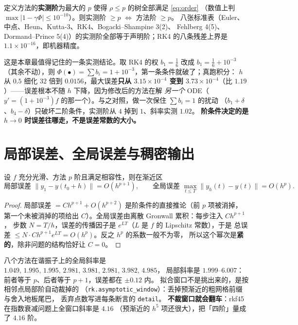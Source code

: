 \begin{corollary}[名义阶与实测阶]
\label{cor:measured}
定义方法的\textbf{实测阶}为最大的 $p$ 使得 $\rho\le p$ 的树全部满足 \eqref{eq:order}
（数值上判 $\max|1-\gamma\Phi|\le10^{-10}$）。则实测阶 $\ge p$ $\iff$ 方法阶 $\ge p$。
八张标准表（Euler、中点、Heun、Kutta-3、RK4、Bogacki--Shampine 3(2)、
Fehlberg 4(5)、Dormand--Prince 5(4)）的实测阶全部等于声明阶；RK4 的八条残差上界是
$1.1\times10^{-16}$，即机器精度。
\end{corollary}

\begin{remark}
这是本章最值得记住的一条实测结论。取 RK4 的权 $b_1=\frac16$ 改成 $b_1=\frac16+10^{-3}$
（其余不动），则 $\Phi(\bullet)=\sum b_i=1+10^{-3}$，第一条条件就破了；真跑积分：
$h$ 从 $0.5$ 细化 $32$ 倍到 $0.0156$，最大误差\textbf{只从 $3.15\times10^{-4}$ 变到
$3.73\times10^{-4}$}（比 $1.19$）——误差根本不随 $h$ 下降，因为修改后的方法在解
\emph{另一个} ODE（$y'=(1+10^{-3})f$ 的那一个）。与之对照，做一次保住 $\sum b_i=1$ 的扰动
（$b_1+\delta$、$b_4-\delta$）只破坏二阶条件，实测阶从 $4$ 掉到 $1$、斜率实测 $1.02$。
\textbf{阶条件决定的是 $h\to0$ 时误差往哪走，不是误差常数的大小。}
\end{remark}

\section{局部误差、全局误差与稠密输出}

\begin{theorem}[局部与全局：$p+1$ 与 $p$]
\label{thm:local-global}
设 $f$ 充分光滑、方法 $p$ 阶且满足相容性，则在渐近区
\begin{equation}
  \text{局部误差 }\|y_1-y(t_0+h)\|=O(h^{p+1}),\qquad
  \text{全局误差 }\max_{t\le T}\|y_h(t)-y(t)\|=O(h^{p}) .
\end{equation}
\end{theorem}

\begin{proof}
局部误差 $=Ch^{p+1}+O(h^{p+2})$ 是阶条件的直接推论（前 $p$ 项被消掉，
第一个未被消掉的项给出 $C$）。全局误差由离散 Gronwall 累积：每步注入 $Ch^{p+1}$，
步数 $N=T/h$，误差的传播因子是 $e^{LT}$（$L$ 是 $f$ 的 Lipschitz 常数），于是
总误差 $\le N\cdot Ch^{p+1}e^{LT}=O(h^{p})$。反之 $h^p$ 的系数一般不为零，
所以这个幂次是\textbf{紧的}，除非问题的结构恰好让 $C=0$。
\end{proof}

\begin{remark}[实测]
八个方法在谐振子上的全局斜率是
$1.049,\,1.995,\,1.995,\,2.981,\,3.981,\,2.981,\,3.982,\,4.985$，
局部斜率是 $1.999$--$6.007$：前者等于 $p$、后者等于 $p+1$，误差都在 $\pm0.12$ 内。
拟合窗口不是挑出来的，是按相邻点局部阶自动裁掉的
（\texttt{rk.asymptotic\_window}）：丢掉预渐近的粗网格前缀与舍入地板尾巴，
丢弃点数写进每条断言的 \texttt{detail}。
\textbf{不裁窗口就会翻车}：rkf45 在指数衰减问题上全窗口斜率是 $4.16$
（预渐近的 $h^5$ 项还很大），把「四阶」量成了 $4.16$ 阶。
\end{remark}

